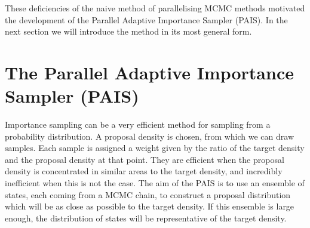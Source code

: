 \documentclass[final]{siamltex}
\begin{document}
These deficiencies of the naive method of parallelising MCMC methods
motivated the development of the Parallel Adaptive Importance Sampler
(PAIS). In the next section we will introduce the method in its most
general form.

\section{The Parallel Adaptive Importance Sampler \allowbreak (PAIS)}\label{Sec:PAIS}



Importance sampling can be a very efficient method for sampling from a
probability distribution. A proposal density is chosen, from which we
can draw samples. Each sample is assigned a weight given by the
ratio of the target density and the proposal density at that
point. They are efficient when the proposal density is concentrated in
similar areas to the target density, and incredibly inefficient when
this is not the case. The aim of the PAIS is to use an ensemble of states,
each coming from a MCMC chain, to construct a proposal
distribution which will be as close as possible to the target density. If this
ensemble is large enough, the distribution of states will be representative
of the target density.
\end{document}
